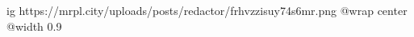  
 
 
 
 

\ifcmt
  ig https://mrpl.city/uploads/posts/redactor/frhvzzisuy74s6mr.png
  @wrap center
  @width 0.9
\fi

